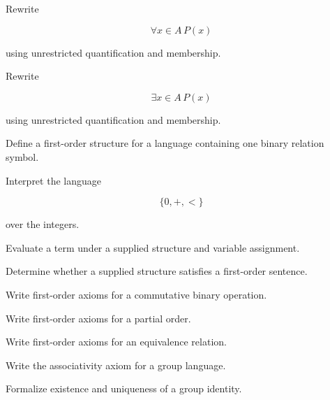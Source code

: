 \begin{exercise}[3]
Rewrite

\[
\forall x\in A\,P(x)
\]

using unrestricted quantification and membership.
\end{exercise}

\begin{exercise}[3]
Rewrite

\[
\exists x\in A\,P(x)
\]

using unrestricted quantification and membership.
\end{exercise}

\begin{exercise}[2]
Define a first-order structure for a language containing one binary
relation symbol.
\end{exercise}

\begin{exercise}[3]
Interpret the language

\[
\{0,+,<\}
\]

over the integers.
\end{exercise}

\begin{exercise}[3]
Evaluate a term under a supplied structure and variable assignment.
\end{exercise}

\begin{exercise}[3]
Determine whether a supplied structure satisfies a first-order sentence.
\end{exercise}

\begin{exercise}[3]
Write first-order axioms for a commutative binary operation.
\end{exercise}

\begin{exercise}[3]
Write first-order axioms for a partial order.
\end{exercise}

\begin{exercise}[3]
Write first-order axioms for an equivalence relation.
\end{exercise}

\begin{exercise}[3]
Write the associativity axiom for a group language.
\end{exercise}

\begin{exercise}[3]
Formalize existence and uniqueness of a group identity.
\end{exercise}

